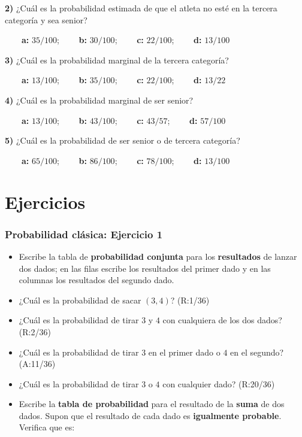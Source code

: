 \documentclass[
]{book}
\begin{document}
\textbf{2)} ¿Cuál es la probabilidad estimada de que el atleta no esté en la tercera categoría y sea senior?

\textbf{\(\qquad\)a:} \(35/100\); \textbf{\(\qquad\)b:} \(30/100\); \textbf{\(\qquad\)c:} \(22/100\); \textbf{\(\qquad\)d:} \(13/100\)

\textbf{3)} ¿Cuál es la probabilidad marginal de la tercera categoría?

\textbf{\(\qquad\)a:} \(13/100\); \textbf{\(\qquad\)b:} \(35/100\); \textbf{\(\qquad\)c:} \(22/100\); \textbf{\(\qquad\)d:} \(13/22\)

\textbf{4)} ¿Cuál es la probabilidad marginal de ser senior?

\textbf{\(\qquad\)a:} \(13/100\); \textbf{\(\qquad\)b:} \(43/100\); \textbf{\(\qquad\)c:} \(43/57\); \textbf{\(\qquad\)d:} \(57/100\)

\textbf{5)} ¿Cuál es la probabilidad de ser senior o de tercera categoría?

\textbf{\(\qquad\)a:} \(65/100\); \textbf{\(\qquad\)b:} \(86/100\); \textbf{\(\qquad\)c:} \(78/100\); \textbf{\(\qquad\)d:} \(13/100\)

\hypertarget{ejercicios-1}{%
\section{Ejercicios}\label{ejercicios-1}}

\hypertarget{probabilidad-cluxe1sica-ejercicio-1}{%
\subsubsection{Probabilidad clásica: Ejercicio 1}\label{probabilidad-cluxe1sica-ejercicio-1}}

\begin{itemize}
\item
  Escribe la tabla de \textbf{probabilidad conjunta} para los \textbf{resultados} de lanzar dos dados; en las filas escribe los resultados del primer dado y en las columnas los resultados del segundo dado.
\item
  ¿Cuál es la probabilidad de sacar \((3,4)\)? (R:1/36)
\item
  ¿Cuál es la probabilidad de tirar \(3\) y \(4\) con cualquiera de los dos dados? (R:2/36)
\item
  ¿Cuál es la probabilidad de tirar \(3\) en el primer dado o \(4\) en el segundo? (A:11/36)
\item
  ¿Cuál es la probabilidad de tirar \(3\) o \(4\) con cualquier dado? (R:20/36)
\item
  Escribe la \textbf{tabla de probabilidad} para el resultado de la \textbf{suma} de dos dados. Supon que el resultado de cada dado es \textbf{igualmente probable}. Verifica que es:
\end{itemize}
\end{document}
